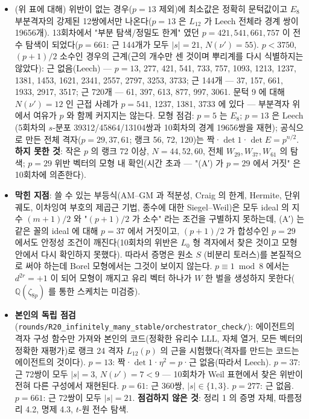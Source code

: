 \begin{itemize}
\tightlist
\item
  (위 표에 대해) 위반이 없는 경우(\(p=13\) 제외)에 최소값은 정확히 문턱값이고 \(E_8\) 부분격자의 강제된 12쌍에서만 나온다(\(p=13\) 은 \(L_{12}\) 가 Leech 전체라 경계 쌍이 19656개). 13회차에서 "부분 탐색/정밀도 한계" 였던 \(p=421,541,661,757\) 이 전수 탐색이 되었다(\(p=661\): 근 144개가 모두 \(|s|=21\), \(N(\nu')=55\)). \(p<3750\), \((p+1)/2\) 소수인 경우의 근계(근의 개수만 센 것이며 뿌리계를 다시 식별하지는 않았다): 근 없음(Leech) --- \(p=13\), 277, 421, 541, 733, 757, 1093, 1213, 1237, 1381, 1453, 1621, 2341, 2557, 2797, 3253, 3733; 근 144개 --- 37, 157, 661, 1933, 2917, 3517; 근 720개 --- 61, 397, 613, 877, 997, 3061. 문턱 9 에 대해 \(N(\nu')=12\) 인 근접 사례가 \(p=541\), 1237, 1381, 3733 에 있다 --- 부분격자 위에서 여유가 \(p\) 와 함께 커지지는 않는다. 모형 점검: \(p=5\) 는 \(E_8\); \(p=13\) 은 Leech (5회차의 \(s\)-분포 39312/45864/13104쌍과 10회차의 경계 19656쌍을 재현); 공식으로 만든 전체 격자(\(p=29,37,61\); 랭크 56, 72, 120)는 짝·\(\det1\)·\(\det E=p^{n/2}\). \textbf{하지 못한 것}: 작은 \(p\) 의 랭크 72 이상, \(N=44,52,60\), 전체 \(W_{29},W_{37},W_{61}\) 의 탐색; \(p=29\) 위반 벡터의 모형 내 확인(시간 초과 --- "(A′) 가 \(p=29\) 에서 거짓" 은 10회차에 의존한다).
\item
  \textbf{막힌 지점}: 쓸 수 있는 부등식(AM--GM 과 적분성, Craig 의 한계, Hermite, 단위 궤도, 이차잉여 부호의 제곱근 기법, 종수에 대한 Siegel--Weil)은 모두 ideal 의 지수 \((m+1)/2\) 와 "\((p+1)/2\) 가 소수" 라는 조건을 구별하지 못하는데, (A′) 는 같은 꼴의 ideal 에 대해 \(p=37\) 에서 거짓이고, \((p+1)/2\) 가 합성수인 \(p=29\) 에서도 안정성 조건이 깨진다(10회차의 위반은 \(L_0\) 형 격자에서 찾은 것이고 모형 안에서 다시 확인하지 못했다). 따라서 증명은 원소 \(S\) (비분리 토러스)를 본질적으로 써야 하는데 Borel 모형에서는 그것이 보이지 않는다. \(p\equiv1\bmod8\) 에서는 \(d^{2r}=+1\) 이 되어 모형이 깨지고 유리 벡터 하나가 \(W\) 한 벌을 생성하지 못한다(\(\mathbb Q(\zeta_{8p})\) 를 통한 스케치는 미검증).
\item
  \textbf{본인의 독립 점검} (\texttt{rounds/R20\_infinitely\_many\_stable/orchestrator\_check/}): 에이전트의 격자 구성 함수만 가져와 본인의 코드(정확한 유리수 LLL, 자체 열거, 모든 벡터의 정확한 재평가)로 랭크 24 격자 \(L_{12}(p)\) 의 근을 시험했다(격자를 만드는 코드는 에이전트의 것이다). \(p=13\): 짝·\(\det1\)·\(\eta^2=p\)·근 없음(따라서 Leech). \(p=37\): 근 72쌍이 모두 \(|s|=3\), \(N(\nu')=7<9\) --- 10회차가 Weil 표현에서 찾은 위반이 전혀 다른 구성에서 재현된다. \(p=61\): 근 360쌍, \(|s|\in\{1,3\}\). \(p=277\): 근 없음. \(p=661\): 근 72쌍이 모두 \(|s|=21\). \textbf{점검하지 않은 것}: 정리 1 의 증명 자체, 따름정리 4.2, 명제 4.3, \(t\)-원 전수 탐색.

\end{itemize}

